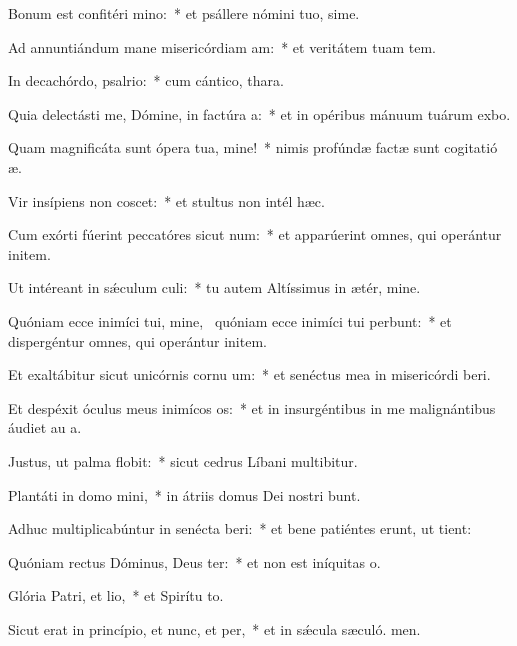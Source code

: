 \item Bonum est confitéri mino:~* et psállere nómini tuo, sime.
\item Ad annuntiándum mane misericórdiam am:~* et veritátem tuam  tem.
\item In decachórdo, psalrio:~* cum cántico,  thara.
\item Quia delectásti me, Dómine, in factúra a:~* et in opéribus mánuum tuárum exbo.
\item Quam magnificáta sunt ópera tua, mine!~* nimis profúndæ factæ sunt cogitatió æ.
\item Vir insípiens non coscet:~* et stultus non intél hæc.
\item Cum exórti fúerint peccatóres sicut num:~* et apparúerint omnes, qui operántur initem.
\item Ut intéreant in sǽculum culi:~* tu autem Altíssimus in ætér, mine.
\item Quóniam ecce inimíci tui, mine,~\pscross{} quóniam ecce inimíci tui perbunt:~* et dispergéntur omnes, qui operántur initem.
\item Et exaltábitur sicut unicórnis cornu um:~* et senéctus mea in misericórdi beri.
\item Et despéxit óculus meus inimícos os:~* et in insurgéntibus in me malignántibus áudiet au a.
\item Justus, ut palma flobit:~* sicut cedrus Líbani multibitur.
\item Plantáti in domo mini,~* in átriis domus Dei nostri bunt.
\item Adhuc multiplicabúntur in senécta beri:~* et bene patiéntes erunt, ut tient:
\item Quóniam rectus Dóminus, Deus ter:~* et non est iníquitas  o.
\item Glória Patri, et lio,~* et Spirítu to.
\item Sicut erat in princípio, et nunc, et per,~* et in sǽcula sæculó. men.
